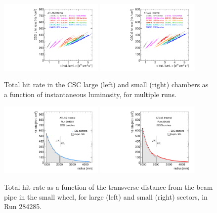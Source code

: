 \begin{figure}
  \begin{center}
    \includegraphics[width=0.45\textwidth]{./figures/rate_adc_vs_lumi_vs_evts_csc_CSL1_overlay.pdf}
    \includegraphics[width=0.45\textwidth]{./figures/rate_adc_vs_lumi_vs_evts_csc_CSS1_overlay.pdf}
    \caption{Total hit rate in the CSC large (left) and small (right) chambers as a function of instantaneous luminosity, for multiple runs.}
    \label{fig:hitrates-vs-lumi-csc-adc}
  \end{center}
\end{figure}

\begin{figure}
  \begin{center}
    \includegraphics[width=0.45\textwidth]{./figures/rate_adc_vs_r_EIL_00284285.pdf}
    \includegraphics[width=0.45\textwidth]{./figures/rate_adc_vs_r_EIS_00284285.pdf}
    \caption{Total hit rate as a function of the transverse distance from the beam pipe in the small wheel, for large (left) and small (right) sectors, in Run 284285.}
    \label{fig:hitrates-vs-r-adc}
  \end{center}
\end{figure}

